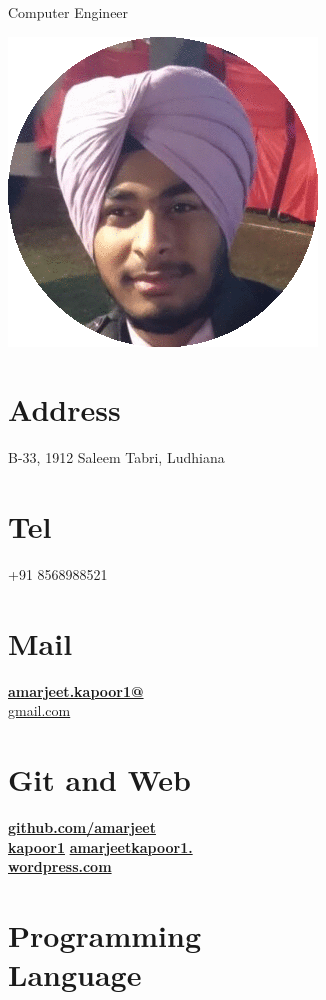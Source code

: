\documentclass[]{friggeri-cv}
\begin{document}
      {Computer Engineer}
      

\begin{aside}
\includegraphics[scale=0.30]{amar.png}
  \section{Address}
    B-33, 1912 
    Saleem Tabri, Ludhiana
    ~
  \section{Tel}
    +91 8568988521
    ~
  \section{Mail}
    \href{mailto:amarjeet.kapoor1@gmail.com}{\textbf{amarjeet.kapoor1@}\\gmail.com}
    ~
  \section{Git and Web}
    \href{http://github.com/amarjeetkapoor1}{\textbf{github.com/amarjeet \\ kapoor1}}
    \href{http://amarjeetkapoor1.wordpress.com}{\textbf{amarjeetkapoor1.\\wordpress.com}}
    ~
  \section{Programming \\ Language}
    ~

\end{aside}
\end{document}
